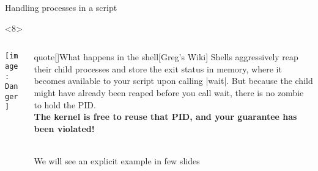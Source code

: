 \begin{frame}{Handling processes in a script}
\begin{overlayarea}{\textwidth}{0.7\textheight}
        \begin{onlyenv}<8>
            \vspace{-2mm}
            \begin{columns}[c]
                \begin{column}{0.25\textwidth}
                    \centering\texttt{[image: Danger]}
                \end{column}
                \begin{column}{0.7\textwidth}
                    \begin{varblock}{quote}[\textwidth]{What happens in the shell}[Greg's Wiki]
                        Shells aggressively reap their child processes and store the exit status in memory, where it becomes available to your script upon calling \textnormal{\bash|wait|}.
                        But because the child might have already been reaped before you call wait, there is no zombie to hold the PID.\\
                        \alert{\textbf{The kernel is free to reuse that PID, and your guarantee has been violated!}}\\[-1.5ex] ~
                    \end{varblock}
                    \vspace{-3mm}
                    \centering\tiny We will see an explicit example in few slides
                \end{column}
            \end{columns}
        \end{onlyenv}
    \end{overlayarea}
    \PrepareURLsymbol[PB]
\end{frame}

